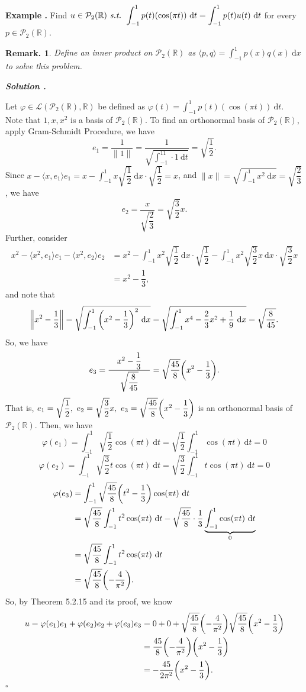 \documentclass[11pt, letterpaper]{article}
\newcounter{index}[subsection]
\newenvironment*{eg}{\begin{framed}\par\noindent\textbf{Example \thesubsection.\stepcounter{index}\theindex}}{\par\end{framed}}
\newcounter{nprf}[subsection]
\newenvironment*{sol}{\par\indent\textbf{\textit{Solution \stepcounter{nprf}\thenprf.}}\par}{\hfill{$\square$}\par}
\newtheorem*{rmk}{Remark.}
\def\dsst{\displaystyle}
\def\R{\mathbb{R}}
\def\d{\mathrm{d}}
\def\P{\mathcal{P}}
\def\L{\mathcal{L}}
\def\phi{\varphi}
\def\st{\emph{ s.t. }}
\begin{document}
\begin{eg}{}
	Find $u\in\P_2(\R)\st\dsst\int_{-1}^1p(t)(\cos(\pi t))\ \d t=\int_{-1}^1p(t)u(t)\ \d t$ for every $p\in\P_2(\R)$.
	\begin{rmk} Define an inner product on $\P_2(\R)$ as $\langle p,q\rangle=\dsst\int_{-1}^1p(x)q(x)\ \d x$ to solve this problem.\end{rmk}
	\begin{sol}
		Let $\phi\in\L(\P_2(\R),\R)$ be defined as $\phi(t)=\dsst\int_{-1}^1p(t)(\cos(\pi t))\ \d t$. Note that $1,x,x^2$ is a basis of $\P_2(\R)$. To find an orthonormal basis of $\P_2(\R)$, apply Gram-Schmidt Procedure, we have \[e_1=\dfrac{1}{\|1\|}=\dfrac{1}{\sqrt{\dsst\int_{-1}^11\cdot1\ \d t}}=\sqrt{\dfrac{1}{2}}.\] Since $x-\langle x,e_1\rangle e_1=x-\dsst\int_{-1}^1x\sqrt{\dfrac{1}{2}}\ \d x\cdot\sqrt{\dfrac{1}{2}}=x$, and $\|x\|=\sqrt{\dsst\int_{-1}^1x^2\ \d x}=\sqrt{\dfrac{2}{3}}$, we have \[e_2=\dfrac{x}{\sqrt{\dfrac{2}{3}}}=\sqrt{\dfrac{3}{2}}x.\] Further, consider \[\begin{aligned}x^2-\langle x^2,e_1\rangle e_1-\langle x^2,e_2\rangle e_2&=x^2-\dsst\int_{-1}^1x^2\sqrt{\dfrac{1}{2}}\ \d x\cdot\sqrt{\dfrac{1}{2}}-\int_{-1}^1x^2\sqrt{\dfrac{3}{2}}x\ \d x\cdot\sqrt{\dfrac{3}{2}}x\\&=x^2-\dfrac{1}{3},\end{aligned}\] and note that \[\left\|x^2-\dfrac{1}{3}\right\|=\sqrt{\int_{-1}^1\qty(x^2-\dfrac{1}{3})^2\ \d x}=\sqrt{\int_{-1}^1x^4-\dfrac{2}{3}x^2+\dfrac{1}{9}\ \d x}=\sqrt{\dfrac{8}{45}}.\] So, we have \[e_3=\dfrac{\ \ \ x^2-\dfrac{1}{3}\ \ \ }{\sqrt{\dfrac{8}{45}}}=\sqrt{\dfrac{45}{8}}\qty(x^2-\dfrac{1}{3}).\] That is, $e_1=\sqrt{\dfrac{1}{2}},\ e_2=\sqrt{\dfrac{3}{2}}x,\ e_3=\sqrt{\dfrac{45}{8}}\qty(x^2-\dfrac{1}{3})$ is an orthonormal basis of $\P_2(\R)$. Then, we have \[\phi(e_1)=\int_{-1}^1\sqrt{\dfrac{1}{2}}\cos(\pi t)\ \d t=\sqrt{\dfrac{1}{2}}\int_{-1}^1\cos(\pi t)\ \d t=0\] \[\phi(e_2)=\int_{-1}^1\sqrt{\dfrac{3}{2}}t\cos(\pi t)\ \d t=\sqrt{\dfrac{3}{2}}\int_{-1}^1t\cos(\pi t)\ \d t=0\] \[\begin{aligned}\phi(e_3)&=\int_{-1}^1\sqrt{\dfrac{45}{8}}\qty(t^2-\dfrac{1}{3})\cos(\pi t)\ \d t\\&=\sqrt{\dfrac{45}{8}}\int_{-1}^1t^2\cos(\pi t)\ \d t-\sqrt{\dfrac{45}{8}}\cdot\dfrac{1}{3}\underbrace{\int_{-1}^1\cos(\pi t)\ \d t}_0\\&=\sqrt{\dfrac{45}{8}}\int_{-1}^1t^2\cos(\pi t)\ \d t\\&=\sqrt{\dfrac{45}{8}}\qty(-\dfrac{4}{\pi^2}).\end{aligned}\] So, by Theorem 5.2.15 and its proof, we know \[\begin{aligned} u=\phi(e_1)e_1+\phi(e_2)e_2+\phi(e_3)e_3&=0+0+\sqrt{\dfrac{45}{8}}\qty(-\dfrac{4}{\pi^2})\sqrt{\dfrac{45}{8}}\qty(x^2-\dfrac{1}{3})\\&=\dfrac{45}{8}\qty(-\dfrac{4}{\pi^2})\qty(x^2-\dfrac{1}{3})\\&=-\dfrac{45}{2\pi^2}\qty(x^2-\dfrac{1}{3}).\end{aligned}\]
	\end{sol}
\end{eg}
\end{document}
